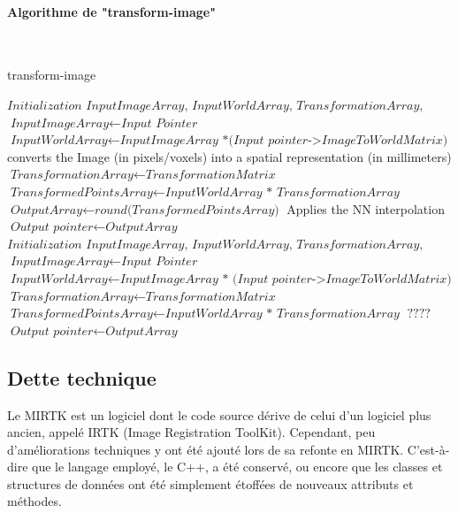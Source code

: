 \documentclass[10pt]{report}
\begin{document}
	
	\paragraph{Algorithme de "transform-image"}
~\par
	
	\begin{algorithm}[H]
	\caption{transform-image}\label{transform-image}
		\begin{algorithmic}[1]
			\State $\textit{Initialization InputImageArray, InputWorldArray, TransformationArray, OutputArray}$
			\State $\textit{InputImageArray} \gets \textit{Input Pointer}$
			\State $\textit{InputWorldArray} \gets \textit{InputImageArray *(Input pointer->ImageToWorldMatrix)}$ 
			\State \Comment converts the Image (in pixels/voxels) into a spatial representation (in millimeters)
			\State $\textit{TransformationArray} \gets \textit{TransformationMatrix}$
			\State $\textit{TransformedPointsArray} \gets \textit{InputWorldArray *  TransformationArray}$ 
			\State $\textit{OutputArray} \gets \textit{round(TransformedPointsArray)}$ \Comment Applies the NN interpolation 
			\State $\textit{Output pointer} \gets \textit{OutputArray}$
			\EndProcedure
			\State $ $
			\State $\textit{Initialization InputImageArray, InputWorldArray, TransformationArray, OutputArray}$
			\State $\textit{InputImageArray} \gets \textit{Input Pointer}$
			\State $\textit{InputWorldArray} \gets \textit{InputImageArray * (Input pointer->ImageToWorldMatrix)}$
			\State $\textit{TransformationArray} \gets \textit{TransformationMatrix}$
			\State $\textit{TransformedPointsArray} \gets \textit{InputWorldArray * TransformationArray}$
		    \State $ ???? $
			\State $\textit{Output pointer} \gets \textit{OutputArray}$
			\EndProcedure
		\end{algorithmic}
	\end{algorithm}

	\subsection{Dette technique}

	Le MIRTK est un logiciel dont le code source dérive de celui d'un logiciel plus ancien, appelé IRTK (Image Registration ToolKit). Cependant, peu d'améliorations techniques y ont été ajouté lors de sa refonte en MIRTK. C'est-à-dire que le langage employé, le C++, a été conservé, ou encore que les classes et structures de données ont été simplement étoffées de nouveaux attributs et méthodes. \\
	
\end{document}
